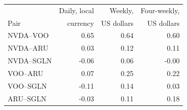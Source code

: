 \begin{tabular}{lrrr}
\toprule
 & Daily, local & Weekly, & Four-weekly, \\
Pair & currency & US dollars & US dollars \\
\midrule
NVDA--VOO & 0.65 & 0.64 & 0.60 \\
NVDA--ARU & 0.03 & 0.12 & 0.11 \\
NVDA--SGLN & -0.06 & 0.06 & -0.00 \\
VOO--ARU & 0.07 & 0.25 & 0.22 \\
VOO--SGLN & -0.11 & 0.14 & 0.03 \\
ARU--SGLN & -0.03 & 0.11 & 0.18 \\
\bottomrule
\end{tabular}
